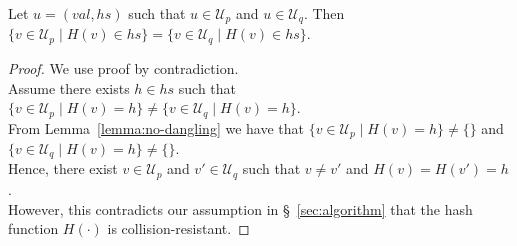 \documentclass[a4paper,anonymous,USenglish]{lipics-v2019}
\begin{document}
\begin{lemma}\label{lemma:no-collision}
Let $u = (\mathit{val}, \mathit{hs})$ such that $u \in \mathcal{U}_p$ and $u \in \mathcal{U}_q$.
Then $\{v \in \mathcal{U}_p \mid H(v) \in \mathit{hs}\} = \{v \in \mathcal{U}_q \mid H(v) \in \mathit{hs}\}$.
\end{lemma}
\begin{proof}
We use proof by contradiction.\\
Assume there exists $h \in \mathit{hs}$ such that $\{v \in \mathcal{U}_p \mid H(v) = h\} \neq \{v \in \mathcal{U}_q \mid H(v) = h\}$.\\
From Lemma~\ref{lemma:no-dangling} we have that $\{v \in \mathcal{U}_p \mid H(v) = h\} \neq \{\}$ and $\{v \in \mathcal{U}_q \mid H(v) = h\} \neq \{\}$.\\
Hence, there exist $v \in \mathcal{U}_p$ and $v' \in \mathcal{U}_q$ such that $v \neq v'$ and $H(v) = H(v') = h$.\\
However, this contradicts our assumption in \S~\ref{sec:algorithm} that the hash function $H(\cdot)$ is collision-resistant.
\end{proof}
\end{document}
